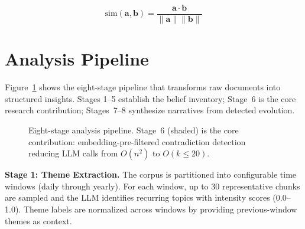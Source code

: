 \documentclass[pdflatex,sn-mathphys-num]{sn-jnl}
\begin{document}
\begin{equation}
\text{sim}(\mathbf{a}, \mathbf{b}) = \frac{\mathbf{a} \cdot \mathbf{b}}{\|\mathbf{a}\| \|\mathbf{b}\|}
\label{eq:cosine}
\end{equation}

\section{Analysis Pipeline}\label{sec:pipeline}

Figure~\ref{fig:pipeline} shows the eight-stage pipeline that transforms raw documents into structured insights. Stages 1--5 establish the belief inventory; Stage~6 is the core research contribution; Stages~7--8 synthesize narratives from detected evolution.

\begin{figure}[t]
\centering
{}
\caption{Eight-stage analysis pipeline. Stage~6 (shaded) is the core contribution: embedding-pre-filtered contradiction detection reducing LLM calls from $O(n^2)$ to $O(k \leq 20)$.}
\label{fig:pipeline}
\end{figure}

\textbf{Stage 1: Theme Extraction.} The corpus is partitioned into configurable time windows (daily through yearly). For each window, up to 30 representative chunks are sampled and the LLM identifies recurring topics with intensity scores (0.0--1.0). Theme labels are normalized across windows by providing previous-window themes as context.
\end{document}

